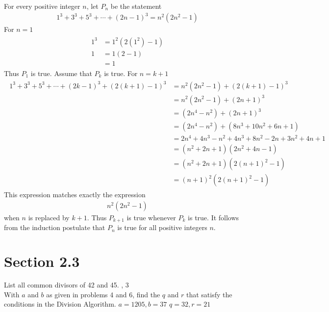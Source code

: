 \documentclass[paper=a4, fontsize=11pt]{jhwhw} %
\begin{document}
For every positive integer $n$, let $P_n$ be the statement
\begin{align}
1^3 + 3^3 + 5^3 + \cdots + \left(2n-1\right)^3 = n^2\left(2n^2-1\right)
\end{align}
\solution
{}
For $n=1$
\begin{align}
\begin{split}
1^3 &= 1^2\left(2\left(1^2\right)-1\right)\\
1 &= 1\left(2-1\right)\\
&= 1
\end{split}
\end{align}
Thus $P_1$ is true.
Assume that $P_k$ is true.
For $n=k+1$
\begin{align}
\begin{split}
1^3 + 3^3 + 5^3 + \cdots + \left(2k-1\right)^3 + \left(2\left(k+1\right)-1\right)^3 &= n^2\left(2n^2-1\right) + \left(2\left(k+1\right)-1\right)^3\\
&=n^2\left(2n^2-1\right) + \left(2n+1\right)^3\\
&=\left(2n^4 - n^2\right) + \left(2n+1\right)^3\\
&=\left(2n^4 - n^2\right) + \left(8n^3 + 10n^2 + 6n + 1\right)\\
&=2n^4 + 4n^3 - n^2 + 4n^3 + 8n^2 - 2n + 3n^2 + 4n + 1\\
&=\left(n^2 + 2n + 1\right)\left(2n^2 + 4n-1\right)\\
&=\left(n^2 + 2n + 1\right)\left(2\left(n+1\right)^2 - 1\right)\\
&=\left(n+1\right)^2\left(2\left(n+1\right)^2-1\right)
\end{split}
\end{align}
This expression matches exactly the expression 
\begin{align}
n^2\left(2n^2-1\right)
\end{align}
when $n$ is replaced by $k+1$. Thus $P_{k+1}$ is true whenever $P_k$ is true. It follows from the induction postulate that $P_n$ is true for all positive integers $n$.

\newpage
\section*{Section 2.3}
List all common divisors of 42 and 45.
, 3\\

With $a$ and $b$ as given in problems 4 and 6, find the $q$ and $r$ that satisfy the conditions in the Division Algorithm.
$a=1205, b=37$
\solution
$q=32, r=21$
\end{document}
